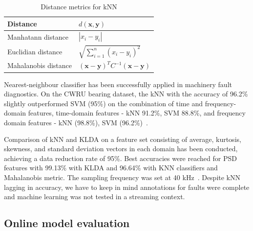 \begin{table}[ht]
\centering
\renewcommand{\arraystretch}{2}
\begin{tabular}{|l|l|}
\hline
\textbf{Distance}     & \textbf{$d(\mathbf{x}, \mathbf{y})$}                                   \\ \hline
Manhatann distance	 & $ |x_i - y_i| $													   \\ \hline
Euclidian distance    & $ \sqrt{\sum_{i = 1}^{n}(x_i - y_i)^2} $                               \\ \hline
Mahalanobis distance  & $ (\mathbf{x} - \mathbf{y})^T C^{-1} (\mathbf{x} - \mathbf{y}) $       \\ \hline
\end{tabular}
\caption{Distance metrics for kNN}
\label{tab:knn-distance}
\end{table}

Nearest-neighbour classifier has been successfully applied in machinery fault diagnostics. On the CWRU bearing dataset, the kNN with the accuracy of 96.2\% slightly outperformed SVM (95\%) on the combination of time and frequency-domain features, time-domain features - kNN 91.2\%, SVM 88.8\%, and frequency domain features - kNN (98.8\%), SVM (96.2\%)~\cite{jamil_feature-based_2021}. 

Comparison of kNN and KLDA on a feature set consisting of average, kurtosis, skewness, and standard deviation vectors in each domain has been conducted, achieving a data reduction rate of 95\%. Best accuracies were reached for PSD features with 99.13\% with KLDA and 96.64\% with KNN classifiers and Mahalanobis metric. The sampling frequency was set at 40 kHz~\cite{altaf_new_2022}. Despite kNN lagging in accuracy, we have to keep in mind annotations for faults were complete and machine learning was not tested in a streaming context.


\subsection{Online model evaluation}
